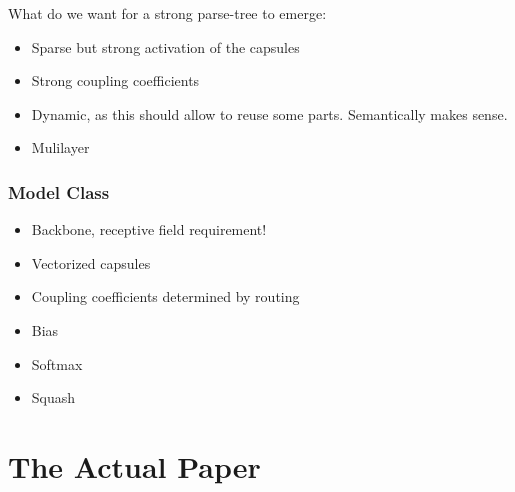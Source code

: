 \documentclass{article}
\begin{document}
What do we want for a strong parse-tree to emerge:
\begin{itemize}
	\item Sparse but strong activation of the capsules
	\item Strong coupling coefficients
	\item Dynamic, as this should allow to reuse some parts. Semantically makes sense.
	\item Mulilayer
\end{itemize}

\subsubsection*{Model Class}
\begin{itemize}
	\item Backbone, receptive field requirement!
	\item Vectorized capsules
	\item Coupling coefficients determined by routing
	\item Bias
	\item Softmax
	\item Squash
\end{itemize}


\section{The Actual Paper}
\end{document}
